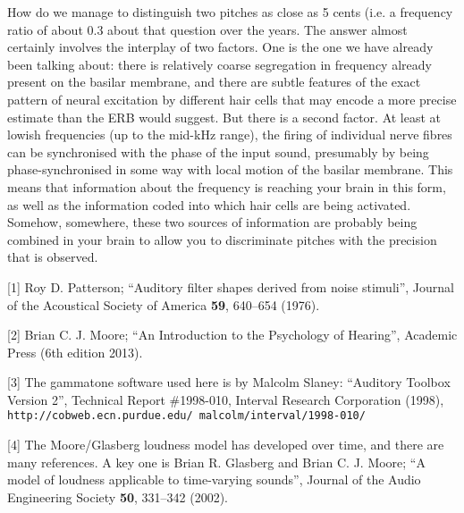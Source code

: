   How do we manage to distinguish two pitches as close as 5 cents (i.e. a 
  frequency ratio of about 0.3%
  about that question over the years. The answer almost certainly involves the 
  interplay of two factors. One is the one we have already been talking about: 
  there is relatively coarse segregation in frequency already present on the 
  basilar membrane, and there are subtle features of the exact pattern of 
  neural excitation by different hair cells that may encode a more precise 
  estimate than the ERB would suggest. But there is a second factor. At least 
  at lowish frequencies (up to the mid-kHz range), the firing of individual 
  nerve fibres can be synchronised with the phase of the input sound, 
  presumably by being phase-synchronised in some way with local motion of the 
  basilar membrane. This means that information about the frequency is reaching 
  your brain in this form, as well as the information coded into which hair 
  cells are being activated. Somehow, somewhere, these two sources of 
  information are probably being combined in your brain to allow you to 
  discriminate pitches with the precision that is observed. 



  \sectionreferences{}[1] Roy D. Patterson; ``Auditory filter shapes derived 
  from noise stimuli'', Journal of the Acoustical Society of America 
  \textbf{59}, 640--654 (1976). 

  [2] Brian C. J. Moore; ``An Introduction to the Psychology of Hearing'', 
  Academic Press (6th edition 2013). 

  [3] The gammatone software used here is by Malcolm Slaney: ``Auditory Toolbox 
  Version 2'', Technical Report \#1998-010, Interval Research Corporation 
  (1998), \tt{}http://cobweb.ecn.purdue.edu/~malcolm/interval/1998-010/\rm{} 

  [4] The Moore/Glasberg loudness model has developed over time, and there are 
  many references. A key one is Brian R. Glasberg and Brian C. J. Moore; “A 
  model of loudness applicable to time-varying sounds”, Journal of the Audio 
  Engineering Society \textbf{50}, 331--342 (2002). 